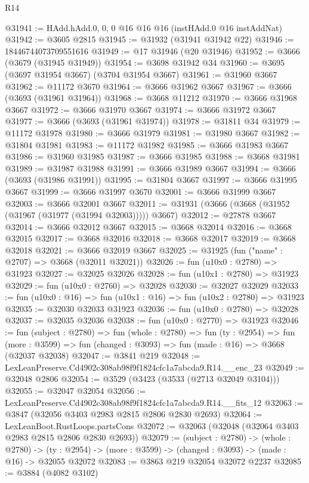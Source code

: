 \begin{lexlean}{R14}
\begin{coremodule}
@31941 := HAdd.hAdd.{0, 0, 0} @16 @16 @16 (instHAdd.{0} @16 instAddNat)
@31942 := @3605 @2815
@31945 := @31932 (@31941 @31942 @22)
@31946 := 18446744073709551616
@31949 := @17 @31946 (@20 @31946)
@31952 := @3666 (@3679 (@31945 @31949))
@31954 := @3698 @31942 @34
@31960 := @3695 (@3697 @31954 @3667) (@3704 @31954 @3667)
@31961 := @31960 @3667
@31962 := @11172 @3670
@31964 := @3666 @31962 @3667
@31967 := @3666 (@3693 (@31961 @31964))
@31968 := @3668 @11212
@31970 := @3666 @31968 @3667
@31972 := @3666 @31970 @3667
@31974 := @3666 @31972 @3667
@31977 := @3666 (@3693 (@31961 @31974))
@31978 := @31811 @34
@31979 := @11172 @31978
@31980 := @3666 @31979
@31981 := @31980 @3667
@31982 := @31804 @31981
@31983 := @11172 @31982
@31985 := @3666 @31983 @3667
@31986 := @31960 @31985
@31987 := @3666 @31985
@31988 := @3668 @31981
@31989 := @31987 @31988
@31991 := @3666 @31989 @3667
@31994 := @3666 (@3693 (@31986 @31991))
@31995 := @31804 @3667
@31997 := @3666 @31995 @3667
@31999 := @3666 @31997 @3670
@32001 := @3666 @31999 @3667
@32003 := @3666 @32001 @3667
@32011 := @31931 (@3666 (@3668 (@31952 (@31967 (@31977 (@31994 @32003))))) @3667)
@32012 := @27878 @3667
@32014 := @3666 @32012 @3667
@32015 := @3668 @32014
@32016 := @3668 @32015
@32017 := @3668 @32016
@32018 := @3668 @32017
@32019 := @3668 @32018
@32021 := @3666 @32019 @3667
@32025 := @31925 (fun ("name" : @2707) => @3668 (@32011 @32021))
@32026 := fun (u10x0 : @2780) => @31923
@32027 := @32025 @32026
@32028 := fun (u10x1 : @2780) => @31923
@32029 := fun (u10x0 : @2760) => @32028
@32030 := @32027 @32029
@32033 := fun (u10x0 : @16) => fun (u10x1 : @16) => fun (u10x2 : @2780) => @31923
@32035 := @32030 @32033 @31923
@32036 := fun (u10x0 : @2780) => @32028
@32037 := @32035 @32036
@32038 := fun (u10x0 : @2770) => @31923
@32046 := fun (subject : @2780) =>
  fun (whole : @2780) =>
  fun (ty : @2954) =>
  fun (more : @3599) => fun (changed : @3093) => fun (made : @16) => @3668 (@32037 @32038)
@32047 := @3841 @219
@32048 := LexLeanPreserve.Cd4902c308ab98f9f1824cfc1a7abcda9.R14.__enc_23
@32049 := @32048 @2806
@32054 := @3529 (@3423 (@3533 (@2713 @32049 @3104)))
@32055 := @32047 @32054
@32056 := LexLeanPreserve.Cd4902c308ab98f9f1824cfc1a7abcda9.R14.__fits_12
@32063 := @3847 (@32056 @3403 @2983 @2815 @2806 @2830 @2693)
@32064 := LexLeanBoot.RustLoops.partsCons
@32072 := @32063 (@32048 (@32064 @3403 @2983 @2815 @2806 @2830 @2693))
@32079 := (subject : @2780) ->
  (whole : @2780) ->
  (ty : @2954) -> (more : @3599) -> (changed : @3093) -> (made : @16) -> @32055 @32072
@32083 := @3863 @219 @32054 @32072 @2237
@32085 := @3884 (@4082 @3102)

\end{coremodule}
\end{lexlean}
